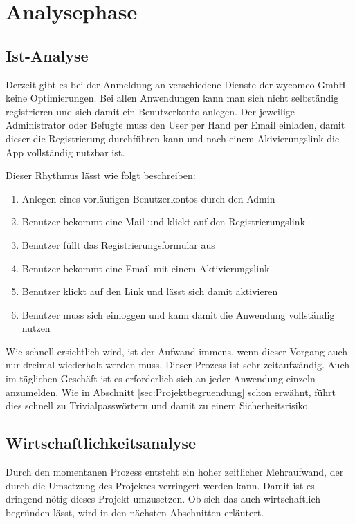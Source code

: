 \section{Analysephase} 
\label{sec:Analysephase}


\subsection{Ist-Analyse} 
\label{sec:IstAnalyse}

Derzeit gibt es bei der Anmeldung an verschiedene Dienste der wycomco GmbH keine Optimierungen. 
Bei allen Anwendungen kann man sich nicht selbständig registrieren und sich damit ein Benutzerkonto anlegen. Der jeweilige Administrator oder Befugte muss den User per Hand per Email einladen, damit dieser die Registrierung durchführen kann und nach einem Akivierungslink die App vollständig nutzbar ist. 

Dieser Rhythmus lässt wie folgt beschreiben:
\begin{enumerate}
	\item Anlegen eines vorläufigen Benutzerkontos durch den Admin
	\item Benutzer bekommt eine Mail und klickt auf den Registrierungslink
	\item Benutzer füllt das Registrierungsformular aus
	\item Benutzer bekommt eine Email mit einem Aktivierungslink
	\item Benutzer klickt auf den Link und lässt sich damit aktivieren
	\item Benutzer muss sich einloggen und kann damit die Anwendung vollständig nutzen
\end{enumerate}

Wie schnell ersichtlich wird, ist der Aufwand immens, wenn dieser Vorgang auch nur dreimal wiederholt werden muss.
Dieser Prozess ist sehr zeitaufwändig. Auch im täglichen Geschäft ist es erforderlich sich an jeder Anwendung einzeln anzumelden. Wie in Abschnitt \ref{sec:Projektbegruendung} schon erwähnt, führt dies schnell zu Trivialpasswörtern und damit zu einem Sicherheitsrisiko. 


\subsection{Wirtschaftlichkeitsanalyse}
\label{sec:Wirtschaftlichkeitsanalyse}

Durch den momentanen Prozess entsteht ein hoher zeitlicher Mehraufwand, der durch die Umsetzung des Projektes verringert werden kann.
Damit ist es dringend nötig dieses Projekt umzusetzen. Ob sich das auch wirtschaftlich begründen lässt, wird in den nächsten Abschnitten erläutert.


